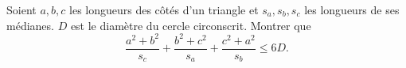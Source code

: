 Soient $a, b, c$ les longueurs des côtés d'un triangle et $s_a, s_b, s_c$ les longueurs de ses médianes. $D$ est le diamètre du cercle circonscrit. Montrer que
\[ \frac{a^2 + b^2}{s_c} + \frac{b^2 + c^2}{s_a} + \frac{c^2 + a^2}{s_b} \leq 6D. \]
